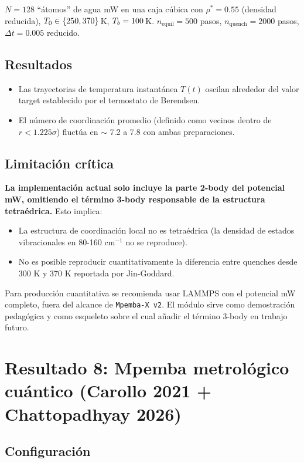 $N = 128$ ``átomos'' de agua mW en una caja cúbica con $\rho^{\ast} = 0.55$ 
(densidad reducida), $T_{0} \in \{250, 370\}\,$K, $T_{b} = 100\,$K. 
$n_{\mathrm{equil}} = 500$ pasos, $n_{\mathrm{quench}} = 2000$ pasos, 
$\Delta t = 0.005$ reducido.

\subsection{Resultados}

\begin{itemize}
\item Las trayectorias de temperatura instantánea $T(t)$ oscilan alrededor del 
valor target establecido por el termostato de Berendsen.
\item El número de coordinación promedio (definido como vecinos dentro de 
$r < 1.225 \sigma$) fluctúa en $\sim$ 7.2 a 7.8 con ambas preparaciones.
\end{itemize}

\subsection{Limitación crítica}

\textbf{La implementación actual solo incluye la parte 2-body del potencial mW, 
omitiendo el término 3-body responsable de la estructura tetraédrica.} Esto 
implica:
\begin{itemize}
\item La estructura de coordinación local no es tetraédrica (la densidad de 
estados vibracionales en 80-160 cm$^{-1}$ no se reproduce).
\item No es posible reproducir cuantitativamente la diferencia entre quenches 
desde 300 K y 370 K reportada por Jin-Goddard.
\end{itemize}

\noindent Para producción cuantitativa se recomienda usar LAMMPS con el 
potencial mW completo, fuera del alcance de \texttt{Mpemba-X v2}. El módulo 
sirve como demostración pedagógica y como esqueleto sobre el cual añadir el 
término 3-body en trabajo futuro.

\section{Resultado 8: Mpemba metrológico cuántico (Carollo 2021 + Chattopadhyay 2026)}

\subsection{Configuración}

